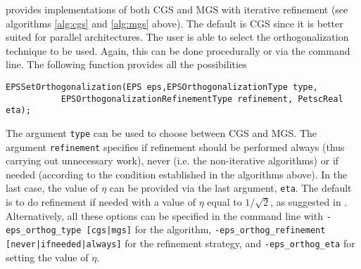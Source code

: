 	\slepc provides implementations of both CGS and MGS with iterative refinement (see algorithms \ref{alg:cgs} and \ref{alg:mgs} above). The default is CGS since it is better suited for parallel architectures. The user is able to select the orthogonalization technique to be used. Again, this can be done procedurally or via the command line. The following function provides all the possibilities
	\begin{Verbatim}[fontsize=\small]
	EPSSetOrthogonalization(EPS eps,EPSOrthogonalizationType type,
           EPSOrthogonalizationRefinementType refinement, PetscReal eta);
	\end{Verbatim}
The argument \Verb!type! can be used to choose between CGS and MGS. The argument \Verb!refinement! specifies if refinement should be performed always (thus carrying out unnecessary work), never (i.e. the non-iterative algorithms) or if needed (according to the condition established in the algorithms above). In the last case, the value of $\eta$ can be provided via the last argument, \Verb!eta!. The default is to do refinement if needed with a value of $\eta$ equal to $1/\sqrt{2}$, as suggested in \citep{Reichel:1990:FSU}. Alternatively, all these options can be specified in the command line with \Verb!-eps_orthog_type [cgs|mgs]! for the algorithm, \Verb!-eps_orthog_refinement! \Verb! [never|ifneeded|always]! for the refinement strategy, and \Verb!-eps_orthog_eta! for setting the value of $\eta$.

